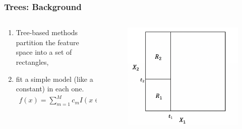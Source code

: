 \documentclass[
  shownotes,
  xcolor={svgnames},
  hyperref={colorlinks,citecolor=DarkBlue,linkcolor=DarkRed,urlcolor=DarkBlue}
  , aspectratio=169]{beamer}
\begin{document}
\begin{frame}[fragile]
\frametitle{Trees: Background}


\begin{columns}[T] %
\begin{column}{.42\textwidth}
  
\begin{enumerate}
\item Tree-based methods partition the feature space into a set of rectangles,
\item  fit a simple model (like a constant) in each one. 
\begin{align}
f(x) = \sum_{m=1}^M c_m I(x\in R_m)
\end{align}
\end{enumerate}


\end{column}  
\hfill
\begin{column}{.48\textwidth}

 \begin{figure}[H] \centering
            \captionsetup{justification=centering}
              \includegraphics[scale=0.4]{figures/cart_3}                           
 \end{figure}

\end{column}
\end{columns}
\end{frame}
\end{document}
